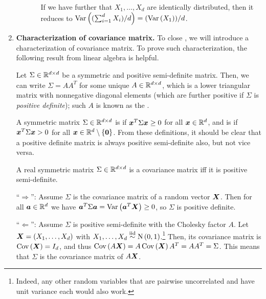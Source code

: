 \begin{enumerate}
\begin{enumerate}
\begin{enumerate}
If we have further that \(X_1,\dotsc,X_d\) are identically distributed, then
it reduces to \(\operatorname{Var}\left((\sum_{i=1}^{d}X_i)/d\right)=(\operatorname{Var}\left(X_1\right))/d\).
\end{enumerate}
\end{enumerate}
\item \textbf{Characterization of covariance matrix.} To close
, we will introduce a characterization of
covariance matrix. To prove such characterization, the following result from
linear algebra is helpful.
\begin{lemma}
\label{lma:cholesky-decomp}
Let \(\Sigma\in\mathbb{R}^{d\times d}\) be a symmetric and positive semi-definite
matrix.  Then, we can write \(\Sigma=AA^{T}\) for some unique \(A\in\mathbb{R}^{d\times
d}\), which is a lower triangular matrix with nonnegative diagonal elements
(which are further positive if \(\Sigma\) is \emph{positive definite}); such
\(A\) is known as the .
\end{lemma}
\begin{note}
A symmetric matrix \(\Sigma\in\mathbb{R}^{d\times d}\) is 
if \(\bm{x}^{T}\Sigma\bm{x}\ge 0\) for all \(\bm{x}\in\mathbb{R}^d\), and is
 if \(\bm{x}^{T}\Sigma\bm{x}>0\) for all
\(\bm{x}\in\mathbb{R}^d\setminus \{\bm{0}\}\). From these definitions, it should be
clear that a positive definite matrix is always positive semi-definite also,
but not vice versa.
\end{note}
\begin{proposition}
\label{prp:cov-matx-char}
A real symmetric matrix \(\Sigma\in\mathbb{R}^{d\times d}\) is a covariance matrix iff
it is positive semi-definite.
\end{proposition}
\begin{pf}
``\(\Rightarrow\)'': Assume \(\Sigma\) is the covariance matrix of a random
vector \(\bm{X}\). Then for all \(\bm{a}\in\mathbb{R}^d\) we have
\(\bm{a}^{T}\Sigma\bm{a}=\operatorname{Var}\left(\bm{a}^{T}\bm{X}\right)\ge 0\), so \(\Sigma\)
is positive definite.

``\(\Leftarrow\)'': Assume \(\Sigma\) is positive semi-definite with the
Cholesky factor \(A\). Let \(\bm{X}=(X_1,\dotsc,X_d)\) with
\(X_1,\dotsc,X_d\overset{\text{iid}}\sim\operatorname{N}\left(0,1\right)\).\footnote{Indeed, any other random variables
that are pairwise uncorrelated and have unit variance each would also work.} Then,
its covariance matrix is \(\operatorname{Cov}\left(\bm{X}\right)=I_d\), and thus
\(\operatorname{Cov}\left(A\bm{X}\right)=A\operatorname{Cov}\left(\bm{X}\right)A^{T}=AA^{T}=\Sigma\). This means that
\(\Sigma\) is the covariance matrix of \(A\bm{X}\).
\end{pf}


\end{enumerate}
